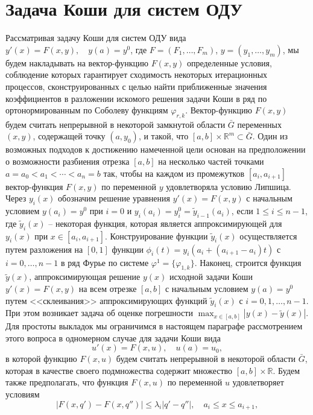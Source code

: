 \section{Задача Коши для систем ОДУ}\label{SobSystemsAndCauchyProblem}
Рассматривая задачу Коши для систем ОДУ вида $y'(x)=F(x,y), \quad y(a)=y^0$, где  $F=(F_1, \ldots, F_m)$, $y=(y_1, \ldots, y_m)$, мы будем накладывать на вектор-функцию   $F(x,y)$ определенные условия, соблюдение которых гарантирует сходимость некоторых итерационных процессов, сконструированных с целью найти приближенные  значения коэффициентов  в разложении искомого решения задачи Коши в ряд  по ортонормированным по Соболеву   функциям $\varphi_{r,k}$. Вектор-функцию   $F(x,y)$  будем считать непрерывной в некоторой замкнутой  области $\bar G$ переменных $(x,y)$, содержащей точку $(a,y_0)$, и такой, что  $[a,b]\times\mathbb{R}^m\subset\bar G$.  Один из возможных подходов к достижению намеченной цели основан на предположении о возможности  разбиения отрезка $[a,b]$ на несколько частей точками $a=a_0<a_1<\cdots<a_n=b$ так, чтобы на каждом из промежутков $[a_i,a_{i+1}]$ вектор-функция   $F(x,y)$ по переменной $y$
удовлетворяла условию Липшица. Через $y_i(x)$ обозначим решение уравнения $y'(x)=F(x,y)$ с начальным условием $y(a_i)= y^0$ при $i=0$ и  $y_i(a_i)= y_i^0= \tilde y_{i-1}(a_i)$,  если $1\le i\le n-1$, где $\tilde y_i(x)$ -- некоторая функция, которая является аппроксимирующей для $y_i(x)$ при $x\in[a_i,a_{i+1}]$.  Конструирование функции $\tilde y_i(x)$  осуществляется путем разложения на $[0,1]$ функции $\phi_i(t)=y_i(a_i+(a_{i+1}-a_i)t)$ с $i=0,\ldots,n-1$ в ряд Фурье по системе  $\varphi^1=\{\varphi_{1,k}\}$.
Наконец,  строится функция $\tilde y(x)$, аппроксимирующая решение $y(x)$ исходной задачи Коши $y'(x)=F(x,y)$ на всем отрезке $[a,b]$  с начальным условием $y(a)=y^0$ путем <<склеивания>> аппроксимирующих функций $\tilde y_i(x)$ с $i=0,1,\ldots, n-1$. При этом возникает задача об оценке погрешности $\max_{x\in[a,b]}|y(x)-\tilde y(x)|$. Для простоты выкладок мы ограничимся в настоящем параграфе рассмотрением этого вопроса в одномерном случае для задачи Коши вида
\begin{equation}\label{3.1}
u'(x)=F(x,u), \quad u(a)=u_0,
\end{equation}
в которой функцию   $F(x,u)$  будем считать непрерывной в некоторой области $\bar G$, которая в качестве своего подмножества содержит множество $[a,b]\times\mathbb{R}$. Будем также предполагать, что функция $F(x,u)$ по переменной $u$  удовлетворяет условиям
\begin{equation}\label{3.2}
|F(x,q')-F(x,q'')|\le \lambda_i|q'-q''|, \quad a_i\le x \le a_{i+1},
\end{equation}
